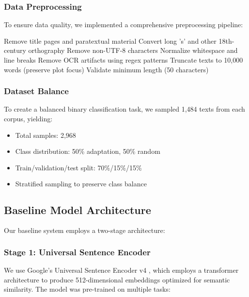 \documentclass[12pt,a4paper]{article}
\begin{document}
\subsubsection{Data Preprocessing}

To ensure data quality, we implemented a comprehensive preprocessing pipeline:

\begin{algorithm}
\caption{Text Preprocessing Pipeline}
\begin{algorithmic}[1]
\STATE Remove title pages and paratextual material
\STATE Convert long 's' and other 18th-century orthography \cite{Underwood2015}
\STATE Remove non-UTF-8 characters
\STATE Normalize whitespace and line breaks
\STATE Remove OCR artifacts using regex patterns
\STATE Truncate texts to 10,000 words (preserve plot focus)
\STATE Validate minimum length (50 characters)
\end{algorithmic}
\end{algorithm}

\subsubsection{Dataset Balance}

To create a balanced binary classification task, we sampled 1,484 texts from each corpus, yielding:

\begin{itemize}
    \item Total samples: 2,968
    \item Class distribution: 50\% adaptation, 50\% random
    \item Train/validation/test split: 70\%/15\%/15\%
    \item Stratified sampling to preserve class balance
\end{itemize}

\subsection{Baseline Model Architecture}

Our baseline system employs a two-stage architecture:

\subsubsection{Stage 1: Universal Sentence Encoder}

We use Google's Universal Sentence Encoder v4 \cite{Cer2018}, which employs a transformer architecture to produce 512-dimensional embeddings optimized for semantic similarity. The model was pre-trained on multiple tasks:
\end{document}
